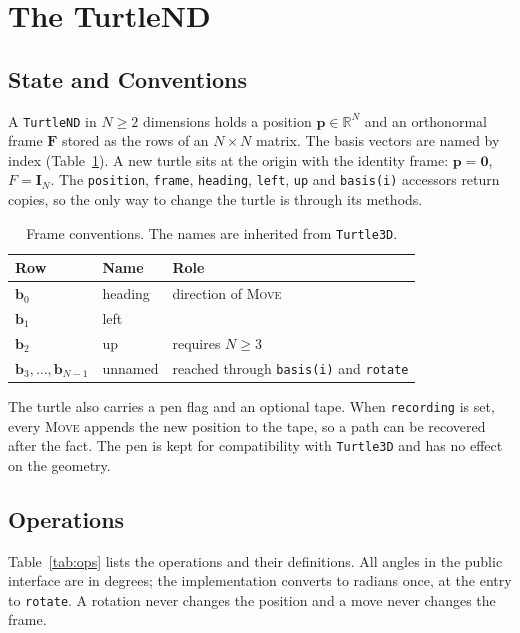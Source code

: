 \documentclass[11pt,letterpaper]{article}
\newcommand{\R}{\mathbb{R}}
\newcommand{\frm}{\mathbf{F}}
\newcommand{\pos}{\mathbf{p}}
\newcommand{\basis}{\mathbf{b}}
\newcommand{\eye}{\mathbf{I}}
\newcommand{\code}[1]{\texttt{#1}}
\newcommand{\op}[1]{\textup{\textsc{#1}}}
\begin{document}
\section{The TurtleND}
\label{sec:turtlend}

\subsection{State and Conventions}

A \code{TurtleND} in $N \geq 2$ dimensions holds a position
$\pos \in \R^N$ and an orthonormal frame $\frm$ stored as the rows of
an $N \times N$ matrix. The basis vectors are named by index
(Table~\ref{tab:names}). A new turtle sits at the origin with the
identity frame: $\pos = \mathbf{0}$, $F = \eye_N$. The
\code{position}, \code{frame}, \code{heading}, \code{left}, \code{up}
and \code{basis(i)} accessors return copies, so the only way to change
the turtle is through its methods.

\begin{table}[h]
\centering
\caption{Frame conventions. The names are inherited from \code{Turtle3D}.}
\label{tab:names}
\begin{tabular}{@{}lll@{}}
\toprule
\textbf{Row} & \textbf{Name} & \textbf{Role} \\
\midrule
$\basis_0$ & heading & direction of \op{Move} \\
$\basis_1$ & left & \\
$\basis_2$ & up & requires $N \geq 3$ \\
$\basis_3, \ldots, \basis_{N-1}$ & unnamed & reached through \code{basis(i)} and \code{rotate} \\
\bottomrule
\end{tabular}
\end{table}

The turtle also carries a pen flag and an optional tape. When
\code{recording} is set, every \op{Move} appends the new position
to the tape, so a path can be recovered after the fact. The pen is kept
for compatibility with \code{Turtle3D} and has no effect on the
geometry.

\subsection{Operations}

Table~\ref{tab:ops} lists the operations and their definitions. All
angles in the public interface are in degrees; the implementation
converts to radians once, at the entry to \code{rotate}. A rotation
never changes the position and a move never changes the frame.
\end{document}
